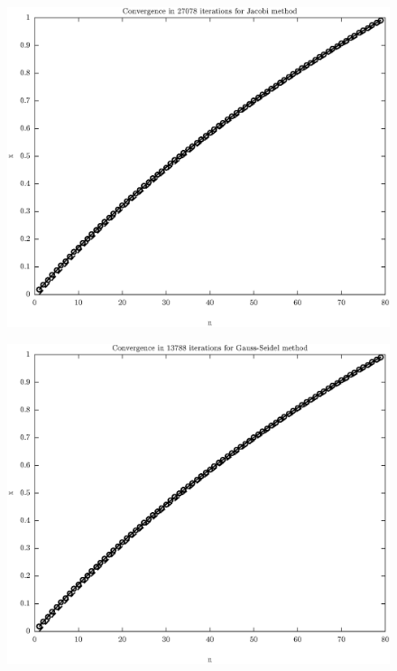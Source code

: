 \documentclass[11pt]{article}
\begin{document}
\begin{figure}
\centering
\begin{minipage}{.45\textwidth}
\centering
\includegraphics[width=\linewidth]{math609_pa2_comp_example_1_n_79_k_Jacobi_part_a.eps}
\label{fig:test1}
\end{minipage}\hfill
\begin{minipage}{.45\textwidth}
\centering
\includegraphics[width=\linewidth]{math609_pa2_comp_example_1_n_79_k_Gauss-Seidel_part_a.eps}

\end{minipage}
\end{figure}
\end{document}
